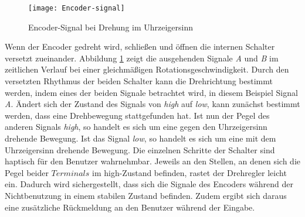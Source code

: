 \begin{figure}[h]
	\texttt{[image: Encoder-signal]}
	\caption{Encoder-Signal bei Drehung im Uhrzeigersinn}
	\label{fig:Encoder-signal}
\end{figure}
Wenn der Encoder gedreht wird, schließen und öffnen die internen Schalter versetzt zueinander. Abbildung \ref{fig:Encoder-signal} zeigt die ausgehenden Signale \textit{A} und \textit{B} im zeitlichen Verlauf bei einer gleichmäßigen Rotationsgeschwindigkeit. Durch den versetzten Rhythmus der beiden Schalter kann die Drehrichtung bestimmt werden, indem eines der beiden Signale betrachtet wird, in diesem Beispiel Signal \textit{A}. Ändert sich der Zustand des Signals von \textit{high} auf \textit{low}, kann zunächst bestimmt werden, dass eine Drehbewegung stattgefunden hat. Ist nun der Pegel des anderen Signals \textit{high}, so handelt es sich um eine gegen den Uhrzeigersinn drehende Bewegung. Ist das Signal \textit{low}, so handelt es sich um eine mit dem Uhrzeigersinn drehende Bewegung. Die einzelnen Schritte der Schalter sind haptisch für den Benutzer wahrnehmbar. Jeweils an den Stellen, an denen sich die Pegel beider $Terminals$ im high-Zustand befinden, rastet der Drehregler leicht ein. Dadurch wird sichergestellt, dass sich die Signale des Encoders während der Nichtbenutzung in einem stabilen Zustand befinden. Zudem ergibt sich daraus eine zusätzliche Rückmeldung an den Benutzer während der Eingabe.\\
